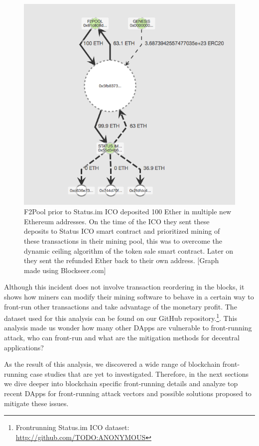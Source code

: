 \begin{figure}[h]
\centering
\includegraphics[width=0.7\linewidth]{figures/F2Pool_transactions_to_StatusICO_and_Refunds.png}
\caption{F2Pool prior to Status.im ICO deposited 100 Ether in multiple new Ethereum addresses. On the time of the ICO they sent these deposits to Status ICO smart contract and prioritized mining of these transactions in their mining pool, this was to overcome the dynamic ceiling algorithm of the token sale smart contract. Later on they sent the refunded Ether back to their own address. [Graph made using Blockseer.com] \label{fig:f2poolfront-run}}
\end{figure}


Although this incident does not involve transaction reordering in the blocks, it shows how miners can modify their mining software to behave in a certain way to front-run other transactions and take advantage of the monetary profit. The dataset used for this analysis can be found on our GitHub repository.\footnote{Frontrunning Status.im ICO dataset: \url{http://github.com/TODO:ANONYMOUS}}. This analysis made us wonder how many other DApps are vulnerable to front-running attack, who can front-run and what are the mitigation methods for decentral applications?

As the result of this analysis, we discovered a wide range of blockchain front-running case studies that are yet to investigated. Therefore, in the next sections we dive deeper into blockchain specific front-running details and analyze top recent DApps for front-running attack vectors and possible solutions proposed to mitigate these issues.


